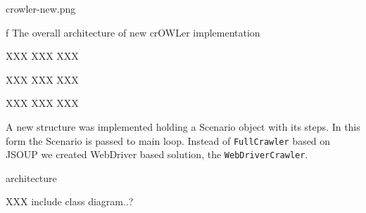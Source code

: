 \midinsert {}
\picw=14cm \cinspic crowler-new.png
\caption/f The overall architecture of new crOWLer implementation
\endinsert

XXX XXX XXX 

XXX XXX XXX 

XXX XXX XXX 

%

A new structure was implemented holding a Scenario object with its steps.  In
this form the Scenario is passed to main loop. Instead of {\tt FullCrawler}
based on JSOUP we created WebDriver based solution, the {\tt WebDriverCrawler}. 


\secc architecture

XXX include class diagram..?


%


